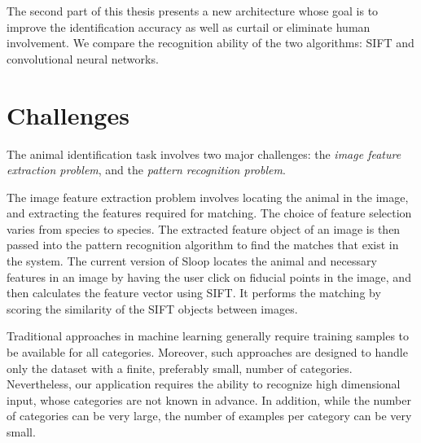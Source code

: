 The second part of this thesis presents a new architecture whose goal is to
improve the identification accuracy as well as curtail or eliminate human
involvement. We compare the recognition ability of the two algorithms: SIFT and
convolutional neural networks.

\section{Challenges}

The animal identification task involves two major challenges: the \emph{image
feature extraction problem}, and the \emph{pattern recognition problem}.

The image feature extraction problem involves locating the animal in the image,
and extracting the features required for matching. The choice of feature
selection varies from species to species. The extracted feature object of an
image is then passed into the pattern recognition algorithm to find the matches
that exist in the system. The current version of Sloop locates the animal and
necessary features in an image by having the user click on fiducial points in
the image, and then calculates the feature vector using SIFT\@. It performs the
matching by scoring the similarity of the SIFT objects between images.

Traditional approaches in machine learning generally require training samples
to be available for all categories. Moreover, such approaches are designed to
handle only the dataset with a finite, preferably small, number of categories.
Nevertheless, our application requires the ability to recognize high
dimensional input, whose categories are not known in advance. In addition,
while the number of categories can be very large, the number of examples per
category can be very small.
